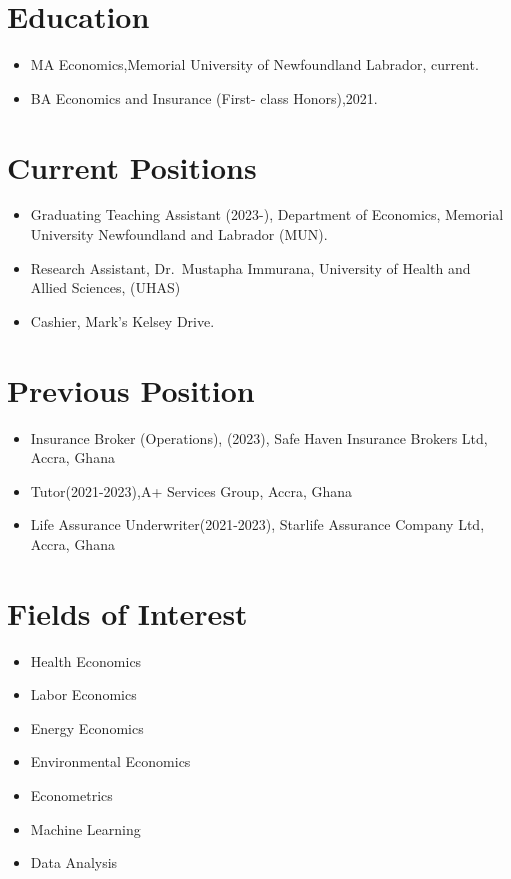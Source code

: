 \documentclass[
  letterpaper,
  DIV=11,
  numbers=noendperiod]{scrartcl}
\providecommand{\tightlist}{%
  \setlength{\itemsep}{0pt}\setlength{\parskip}{0pt}}\usepackage{longtable,booktabs,array}
\begin{document}
\hypertarget{education}{%
\section{Education}\label{education}}

\begin{itemize}
\tightlist
\item
  MA Economics,Memorial University of Newfoundland Labrador, current.
\item
  BA Economics and Insurance (First- class Honors),2021.
\end{itemize}

\hypertarget{current-positions}{%
\section{Current Positions}\label{current-positions}}

\begin{itemize}
\tightlist
\item
  Graduating Teaching Assistant (2023-), Department of Economics,
  Memorial University Newfoundland and Labrador (MUN).
\item
  Research Assistant, Dr.~Mustapha Immurana, University of Health and
  Allied Sciences, (UHAS)
\item
  Cashier, Mark's Kelsey Drive.
\end{itemize}

\hypertarget{previous-position}{%
\section{Previous Position}\label{previous-position}}

\begin{itemize}
\tightlist
\item
  Insurance Broker (Operations), (2023), Safe Haven Insurance Brokers
  Ltd, Accra, Ghana
\item
  Tutor(2021-2023),A+ Services Group, Accra, Ghana
\item
  Life Assurance Underwriter(2021-2023), Starlife Assurance Company Ltd,
  Accra, Ghana
\end{itemize}

\hypertarget{fields-of-interest}{%
\section{Fields of Interest}\label{fields-of-interest}}

\begin{itemize}
\tightlist
\item
  Health Economics
\item
  Labor Economics
\item
  Energy Economics
\item
  Environmental Economics
\item
  Econometrics
\item
  Machine Learning
\item
  Data Analysis
\end{itemize}
\end{document}
